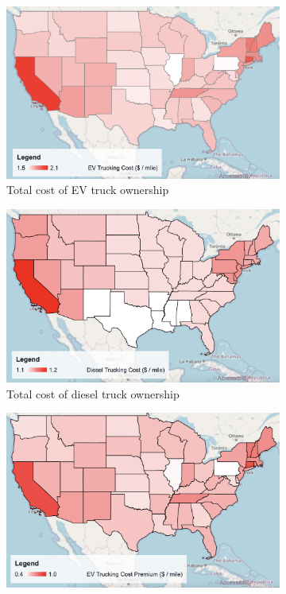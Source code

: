 \begin{figure}[H]
    \centering
    \begin{subfigure}[b]{0.49\textwidth}
        \centering
        \includegraphics[width=\textwidth]{figures/ev_tco_map.png}
        \caption{Total cost of EV truck ownership}
        \label{fig:ev_tco_map}
    \end{subfigure}
    \hfill
    \begin{subfigure}[b]{0.49\textwidth}
        \centering
        \includegraphics[width=\textwidth]{figures/diesel_tco_map.png}
        \caption{Total cost of diesel truck ownership}
        \label{fig:diesel_tco_map}
    \end{subfigure}
    \begin{subfigure}[b]{0.49\textwidth}
        \centering
        \includegraphics[width=\textwidth]{figures/ev_cost_premium_abs.png}

\end{subfigure}
\end{figure}
